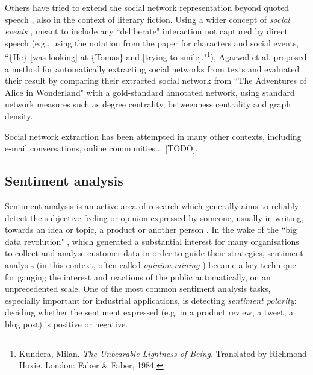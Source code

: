 \documentclass[bsc,frontabs,singlespacing,parskip, twoside]{infthesis}
\begin{document}
Others have tried to extend the social network representation beyond quoted speech \cite{Agarwal2013}, also in the context of literary fiction. Using a wider concept of \textit{social events} \cite{agarwal2010annotation}, meant to include any ``deliberate" interaction not captured by direct speech (e.g., using the notation from the paper for characters and social events, ``\{He\} [was looking] at \{Tomas\} and [trying to smile]."\footnote{Kundera, Milan. \textit{The Unbearable Lightness of Being}. Translated by Richmond Hoxie. London: Faber \& Faber, 1984.}), Agarwal et al. proposed a method for automatically extracting social networks from texts and evaluated their result  by comparing their extracted social network from ``The Adventures of Alice in Wonderland" with a gold-standard annotated network, using standard network measures such as degree centrality, betweenness centrality and graph density.

Social network extraction has been attempted in many other contexts, including e-mail conversations, online communities... [TODO]. 

\subsection{Sentiment analysis}
Sentiment analysis is an active area of research which generally aims to reliably detect the subjective feeling or opinion expressed by someone, usually in writing, towards an idea or topic, a product or another person \cite{varghesesurvey}. In the wake of the ``big data revolution" \cite{mayer2013big}, which generated a substantial interest for many organisations to collect and analyse customer data in order to guide their strategies, sentiment analysis (in this context, often called \textit{opinion mining} \cite{pang2008opinion}) became a key technique for gauging the interest and reactions of the public automatically, on an unprecedented scale. One of the most common sentiment analysis tasks, especially important for industrial applications, is detecting \textit{sentiment polarity}: deciding whether the sentiment expressed (e.g. in a product review, a tweet, a blog post) is positive or negative.
\end{document}
